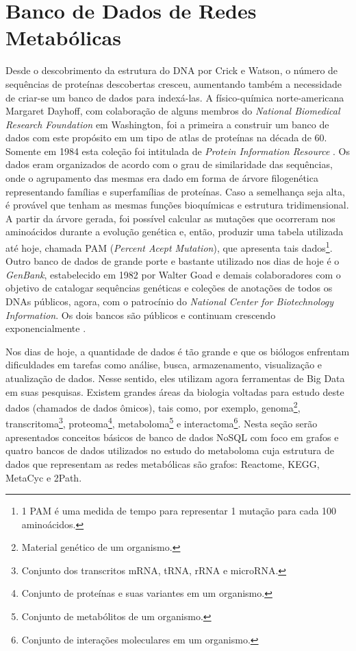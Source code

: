 
\section{Banco de Dados de Redes Metabólicas} \label{BDredes}



\indent Desde o descobrimento da estrutura do DNA por Crick e Watson, o número de sequências de proteínas descobertas cresceu, aumentando também a necessidade de criar-se um banco de dados para indexá-las. A físico-química norte-americana Margaret Dayhoff, com colaboração de alguns membros do \textit{National Biomedical Research Foundation} em Washington, foi a primeira a construir um banco de dados com este propósito em um tipo de atlas de proteínas na década de 60. Somente em 1984 esta coleção foi intitulada de \textit{Protein Information Resource} \cite{mount01}. Os dados eram organizados de acordo com o grau de similaridade das sequências, onde o agrupamento das mesmas era dado em forma de árvore filogenética representando famílias e superfamílias de proteínas. Caso a semelhança seja alta, é provável que tenham as mesmas funções bioquímicas e estrutura tridimensional. A partir da árvore gerada, foi possível calcular as mutações que ocorreram nos aminoácidos durante a evolução genética e, então, produzir uma tabela utilizada até hoje, chamada PAM (\textit{Percent Acept Mutation}), que apresenta tais dados\footnote{1 PAM é uma medida de tempo para representar 1 mutação para cada 100 aminoácidos.}. Outro banco de dados de grande porte e bastante utilizado nos dias de hoje é o \textit{GenBank}, estabelecido em 1982 por Walter Goad e demais colaboradores com o objetivo de catalogar sequências genéticas e coleções de anotações de todos os DNAs públicos, agora, com o patrocínio do \textit{National Center for Biotechnology Information}. Os dois bancos são públicos e continuam crescendo exponencialmente \cite{mount01}. 


\indent Nos dias de hoje, a quantidade de dados é tão grande e  que os biólogos enfrentam dificuldades em tarefas como análise, busca, armazenamento, visualização e atualização de dados. Nesse sentido, eles utilizam agora ferramentas de Big Data em suas pesquisas. Existem grandes áreas da biologia voltadas para estudo deste dados (chamados de dados ômicos), tais como, por exemplo, genoma\footnote{Material genético de um organismo.}, transcritoma\footnote{Conjunto dos transcritos mRNA, tRNA, rRNA e microRNA.}, proteoma\footnote{Conjunto de proteínas e suas variantes em um organismo.}, metaboloma\footnote{Conjunto de metabólitos de um organismo.} e interactoma\footnote{Conjunto de interações moleculares em um organismo.}. Nesta seção serão apresentados conceitos básicos de banco de dados NoSQL com foco em grafos e quatro bancos de dados utilizados no estudo do metaboloma cuja estrutura de dados que representam as redes metabólicas são grafos: Reactome, KEGG, MetaCyc e 2Path. \\

